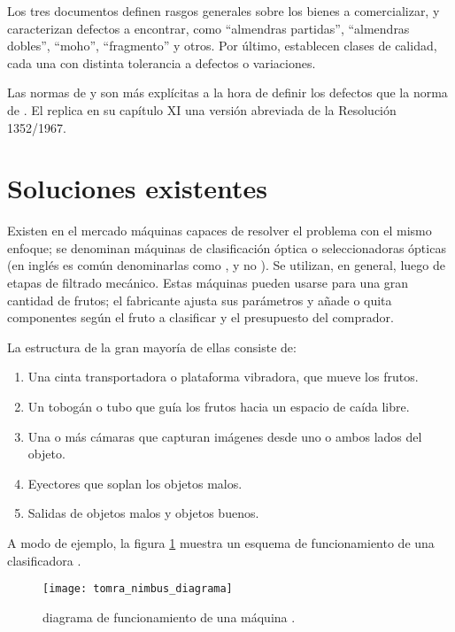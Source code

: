 Los tres documentos definen rasgos generales sobre los bienes a comercializar, y caracterizan defectos a encontrar, como \enquote{almendras partidas}, \enquote{almendras dobles}, \enquote{moho}, \enquote{fragmento} y otros. Por último, establecen clases de calidad, cada una con distinta tolerancia a defectos o variaciones.

Las normas de  y  son más explícitas a la hora de definir los defectos que la norma de . El  replica en su capítulo XI una versión abreviada de la Resolución \num{1352/1967}.~\autocite{codigoalimentario}



\section{Soluciones existentes}
Existen en el mercado máquinas capaces de resolver el problema con el mismo enfoque; se denominan máquinas de clasificación óptica o seleccionadoras ópticas (en inglés es común denominarlas como  , y no ). Se utilizan, en general, luego de etapas de filtrado mecánico. Estas máquinas pueden usarse para una gran cantidad de frutos; el fabricante ajusta sus parámetros y añade o quita componentes según el fruto a clasificar y el presupuesto del comprador. 

La estructura de la gran mayoría de ellas consiste de:

\begin{enumerate}
\item Una cinta transportadora o plataforma vibradora, que mueve los frutos.
\item Un tobogán o tubo que guía los frutos hacia un espacio de caída libre.
\item Una o más cámaras que capturan imágenes desde uno o ambos lados del objeto.
\item Eyectores que soplan los objetos malos.
\item Salidas de objetos malos y objetos buenos.
\end{enumerate}
A modo de ejemplo, la figura \ref{fig:diagramamaquina} muestra un esquema de funcionamiento de una clasificadora .



\begin{figure}[hbtp]
\centering
\texttt{[image: tomra\_nimbus\_diagrama]}
\caption[Diagrama de funcionamiento de una máquina comercial]{diagrama de funcionamiento de una máquina .~\autocite{imagenes:nimbusdiagrama}}
\label{fig:diagramamaquina}
\end{figure}


